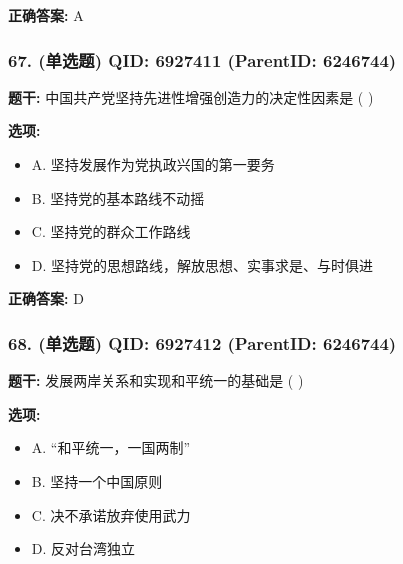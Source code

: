 \documentclass[12pt,UTF8]{ctexart}
\begin{document}
\textbf{正确答案:}
A

\vspace{0.3em}\hrulefill\vspace{0.7em}

\subsubsection*{67. (单选题) \small QID: 6927411 (ParentID: 6246744)}

\textbf{题干:}
中国共产党坚持先进性增强创造力的决定性因素是 ( )



\textbf{选项:}
\begin{itemize}[leftmargin=*]

  \item A. 坚持发展作为党执政兴国的第一要务

  \item B. 坚持党的基本路线不动摇

  \item C. 坚持党的群众工作路线

  \item D. 坚持党的思想路线，解放思想、实事求是、与时俱进

\end{itemize}

\textbf{正确答案:}
D

\vspace{0.3em}\hrulefill\vspace{0.7em}

\subsubsection*{68. (单选题) \small QID: 6927412 (ParentID: 6246744)}

\textbf{题干:}
发展两岸关系和实现和平统一的基础是 ( )



\textbf{选项:}
\begin{itemize}[leftmargin=*]

  \item A. “和平统一，一国两制”

  \item B. 坚持一个中国原则

  \item C. 决不承诺放弃使用武力

  \item D. 反对台湾独立

\end{itemize}
\end{document}
